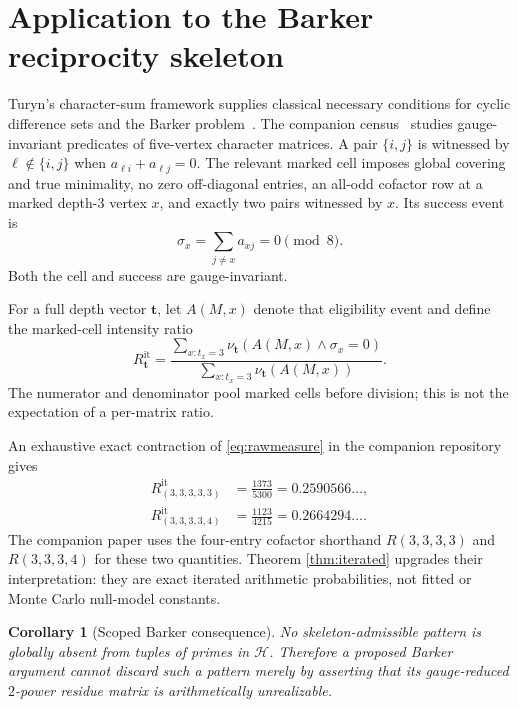 \documentclass[11pt]{article}
\newtheorem{corollary}[theorem]{Corollary}
\theoremstyle{definition}
\theoremstyle{remark}
\newcommand{\itlaw}{\mathrm{it}}
\begin{document}
\section{Application to the Barker reciprocity skeleton}

Turyn's character-sum framework supplies classical necessary conditions
for cyclic difference sets and the Barker problem~\cite{Turyn}.  The
companion census~\cite{Census} studies gauge-invariant predicates of
five-vertex character matrices.  A pair $\{i,j\}$ is witnessed by
$\ell\notin\{i,j\}$ when $a_{\ell i}+a_{\ell j}=0$.  The relevant marked
cell imposes global covering and true minimality, no zero off-diagonal
entries, an all-odd cofactor row at a marked depth-$3$ vertex $x$, and
exactly two pairs witnessed by $x$.  Its success event is
\[
  \sigma_x=\sum_{j\ne x}a_{xj}=0\pmod8.
\]
Both the cell and success are gauge-invariant.

For a full depth vector $\mathbf t$, let $A(M,x)$ denote that eligibility
event and define the marked-cell intensity ratio
\begin{equation}\label{eq:Rit}
 R^{\itlaw}_{\mathbf t}=
 \frac{\sum_{x:t_x=3}\nu_{\mathbf t}(A(M,x)\wedge\sigma_x=0)}
      {\sum_{x:t_x=3}\nu_{\mathbf t}(A(M,x))}.
\end{equation}
The numerator and denominator pool marked cells before division; this is
not the expectation of a per-matrix ratio.

An exhaustive exact contraction of \eqref{eq:rawmeasure} in the companion
repository gives~\cite{Census}
\begin{align}
 R^{\itlaw}_{(3,3,3,3,3)}&=\frac{1373}{5300}=0.2590566\ldots,\\
 R^{\itlaw}_{(3,3,3,3,4)}&=\frac{1123}{4215}=0.2664294\ldots.
\end{align}
The companion paper uses the four-entry cofactor shorthand
$R(3,3,3,3)$ and $R(3,3,3,4)$ for these two quantities.  Theorem
\ref{thm:iterated} upgrades their interpretation: they are exact iterated
arithmetic probabilities, not fitted or Monte Carlo null-model constants.

\begin{corollary}[Scoped Barker consequence]\label{cor:barker}
No skeleton-admissible pattern is globally absent from tuples of primes in
$\mathcal H$.  Therefore a proposed Barker argument cannot discard such a
pattern merely by asserting that its gauge-reduced $2$-power residue matrix
is arithmetically unrealizable.
\end{corollary}
\end{document}
